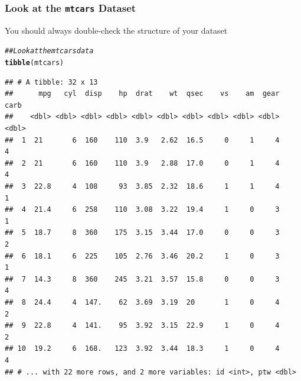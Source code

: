 \documentclass{beamer}\usepackage[]{graphicx}\usepackage[]{color}
\makeatletter
\newcommand{\hlcom}[1]{\textcolor[rgb]{0.678,0.584,0.686}{\textit{#1}}}%
\newcommand{\hlstd}[1]{\textcolor[rgb]{0.345,0.345,0.345}{#1}}%
\newcommand{\hlkwd}[1]{\textcolor[rgb]{0.737,0.353,0.396}{\textbf{#1}}}%
\newenvironment{kframe}{%
 \def\at@end@of@kframe{}%
 \ifinner\ifhmode%
  \def\at@end@of@kframe{\end{minipage}}%
  \begin{minipage}{\columnwidth}%
 \fi\fi%
 \def\FrameCommand##1{\hskip\@totalleftmargin \hskip-\fboxsep
 \colorbox{shadecolor}{##1}\hskip-\fboxsep
     \hskip-\linewidth \hskip-\@totalleftmargin \hskip\columnwidth}%
 \MakeFramed {\advance\hsize-\width
   \@totalleftmargin\z@ \linewidth\hsize
   \@setminipage}}%
 {\par\unskip\endMakeFramed%
 \at@end@of@kframe}
\newenvironment{knitrout}{}{} %
\makeatother
\begin{document}
\begin{frame}[fragile]\frametitle{Look at the \texttt{mtcars} Dataset}
    You should always double-check the structure of your dataset
\begin{knitrout}\footnotesize
{}\color{fgcolor}\begin{kframe}
\begin{alltt}
\hlcom{## Look at the mtcars data}
\hlkwd{tibble}\hlstd{(mtcars)}
\end{alltt}
\begin{verbatim}
## # A tibble: 32 x 13
##      mpg   cyl  disp    hp  drat    wt  qsec    vs    am  gear  carb
##    <dbl> <dbl> <dbl> <dbl> <dbl> <dbl> <dbl> <dbl> <dbl> <dbl> <dbl>
##  1  21       6  160    110  3.9   2.62  16.5     0     1     4     4
##  2  21       6  160    110  3.9   2.88  17.0     0     1     4     4
##  3  22.8     4  108     93  3.85  2.32  18.6     1     1     4     1
##  4  21.4     6  258    110  3.08  3.22  19.4     1     0     3     1
##  5  18.7     8  360    175  3.15  3.44  17.0     0     0     3     2
##  6  18.1     6  225    105  2.76  3.46  20.2     1     0     3     1
##  7  14.3     8  360    245  3.21  3.57  15.8     0     0     3     4
##  8  24.4     4  147.    62  3.69  3.19  20       1     0     4     2
##  9  22.8     4  141.    95  3.92  3.15  22.9     1     0     4     2
## 10  19.2     6  168.   123  3.92  3.44  18.3     1     0     4     4
## # ... with 22 more rows, and 2 more variables: id <int>, ptw <dbl>
\end{verbatim}
\end{kframe}
\end{knitrout}
\end{frame}
\end{document}
